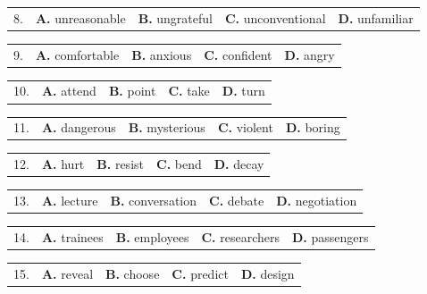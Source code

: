 \documentclass[UTF8,11pt]{ctexart}
\begin{document}
\noindent\begin{tabularx}{\linewidth}{@{}lXXXX@{}}8. & \textbf{A.} unreasonable & \textbf{B.} ungrateful & \textbf{C.} unconventional & \textbf{D.} unfamiliar\\\end{tabularx}\par

\noindent\begin{tabularx}{\linewidth}{@{}lXXXX@{}}9. & \textbf{A.} comfortable & \textbf{B.} anxious & \textbf{C.} confident & \textbf{D.} angry\\\end{tabularx}\par

\noindent\begin{tabularx}{\linewidth}{@{}lXXXX@{}}10. & \textbf{A.} attend & \textbf{B.} point & \textbf{C.} take & \textbf{D.} turn\\\end{tabularx}\par

\noindent\begin{tabularx}{\linewidth}{@{}lXXXX@{}}11. & \textbf{A.} dangerous & \textbf{B.} mysterious & \textbf{C.} violent & \textbf{D.} boring\\\end{tabularx}\par

\noindent\begin{tabularx}{\linewidth}{@{}lXXXX@{}}12. & \textbf{A.} hurt & \textbf{B.} resist & \textbf{C.} bend & \textbf{D.} decay\\\end{tabularx}\par

\noindent\begin{tabularx}{\linewidth}{@{}lXXXX@{}}13. & \textbf{A.} lecture & \textbf{B.} conversation & \textbf{C.} debate & \textbf{D.} negotiation\\\end{tabularx}\par

\noindent\begin{tabularx}{\linewidth}{@{}lXXXX@{}}14. & \textbf{A.} trainees & \textbf{B.} employees & \textbf{C.} researchers & \textbf{D.} passengers\\\end{tabularx}\par

\noindent\begin{tabularx}{\linewidth}{@{}lXXXX@{}}15. & \textbf{A.} reveal & \textbf{B.} choose & \textbf{C.} predict & \textbf{D.} design\\\end{tabularx}\par
\end{document}
